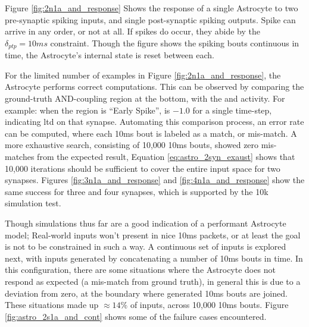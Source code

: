 Figure \ref{fig:2n1a_and_response} Shows the response of a single Astrocyte to
two pre-synaptic spiking inputs, and single post-synaptic spiking outputs. Spike
can arrive in any order, or not at all. If spikes do occur, they abide by the
$\delta_{ptp}=10ms$ constraint. Though the figure shows the spiking bouts
continuous in time, the Astrocyte's internal state is reset between each.


For the limited number of examples in Figure \ref{fig:2n1a_and_response}, the
Astrocyte performs correct computations. This can be observed by comparing the
ground-truth AND-coupling region at the bottom, with the \dser and \serca
activity. For example: when the region is ``Early Spike'', \dser is $-1.0$ for a
single time-step, indicating \Gls{ltd} on that synapse. Automating this comparison
process, an error rate can be computed, where each 10ms bout is labeled as a
match, or mis-match. A more exhaustive search, consisting
of 10,000 10ms bouts, showed zero mis-matches from the expected result, Equation
\ref{eq:astro_2syn_exaust} shows that 10,000 iterations should be sufficient to
cover the entire input space for two synapses. Figures
\ref{fig:3n1a_and_response} and \ref{fig:4n1a_and_response} show the same success
for three and four synapses, which is supported by the 10k simulation test.



Though simulations thus far are a good indication of a performant Astrocyte
model; Real-world inputs won't present in nice 10ms packets, or at least the
goal is not to be constrained in such a way. A continuous set of inputs is
explored next, with inputs generated by concatenating a number of 10ms bouts in
time. In this configuration, there are some situations where the Astrocyte does
not respond as expected (a mis-match from ground truth), in general this is due
to a \ca deviation from zero, at the boundary where generated 10ms bouts are
joined. These situations made up $\approx 14\%$ of inputs, across 10,000 10ms
bouts. Figure \ref{fig:astro_2s1a_and_cont} shows some of the failure cases
encountered.

